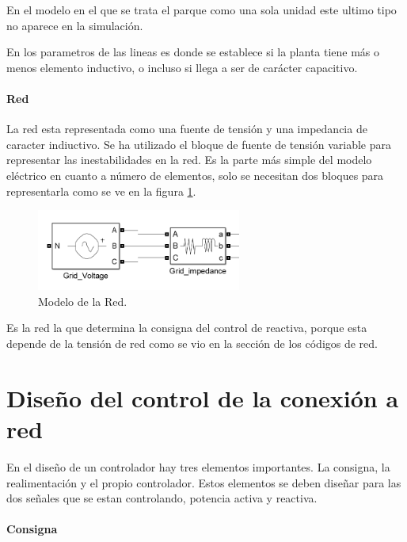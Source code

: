 \documentclass{book}
\begin{document}
En el modelo en el que se trata el parque como una sola unidad este ultimo tipo no aparece en la simulaci\'on. \par

En los parametros de las lineas es donde se establece si la planta tiene más o menos elemento inductivo, o incluso si llega a ser de car\'acter capacitivo. \par


		\paragraph{Red} 

La red esta representada como una fuente de tensi\'on y una impedancia de caracter indiuctivo. Se ha utilizado el bloque de fuente de tensi\'on variable para representar las inestabilidades en la red. Es la parte más simple del modelo el\'ectrico en cuanto a n\'umero de elementos, solo se necesitan dos bloques para representarla como se ve en la figura \ref{GridSimulink}. \par

\begin{figure}[h!]
\centering
\includegraphics[width=0.6\textwidth]{GridSimulink.PNG}
\caption{Modelo de la Red. }
\label{GridSimulink}
\end{figure} \par

Es la red la que determina la consigna del control de reactiva, porque esta depende de la tensi\'on de red como se vio en la secci\'on de los c\'odigos de red. 


	\section{Diseño del control de la conexi\'on a red}

En el diseño de un controlador hay tres elementos importantes. La consigna, la realimentaci\'on y el propio controlador. Estos elementos se deben diseñar para las dos señales que se estan controlando, potencia activa y reactiva. \par

		\paragraph{Consigna}
\end{document}
